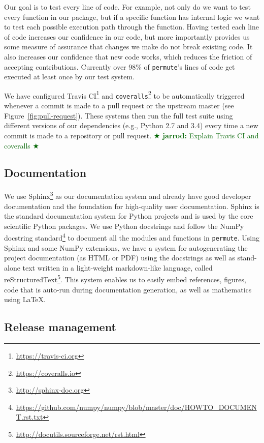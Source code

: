 \documentclass[]{article}
\newcommand{\jarrod}[1] { \textcolor{darkgreen} {
\ensuremath{\bigstar} {\bf jarrod:}  {#1}
\ensuremath{\bigstar} } }
\begin{document}
Our goal is to test every line of code.
For example, not only do we want to test every function in our package, but if
a specific function has internal logic we want to test each possible execution
path through the function.
Having tested each line of code increases our confidence in our code, but
more importantly provides us some measure of assurance that changes we make do
not break existing code.
It also increases our confidence that new code works, which reduces the
friction of accepting contributions.
Currently over 98\% of \texttt{permute}'s lines of code get executed at least
once by our test system.

We have configured Travis CI\footnote{\url{https://travis-ci.org}} and
\texttt{coveralls}\footnote{\url{https://coveralls.io}} to be automatically
triggered whenever a commit is made to a pull request or the upstream master
(see Figure~\ref{fig:pull-request}).
These systems then run the full test suite  using different versions of our
dependencies (e.g., Python 2.7 and 3.4) every time a new commit is made to a
repository or pull request.
\jarrod{Explain Travis CI and coveralls}

\subsection{\label{sec:doc}Documentation}

We use Sphinx\footnote{\url{http://sphinx-doc.org}} as our documentation system
and already have good developer documentation and the foundation for
high-quality user documentation.
Sphinx is the standard documentation system for Python projects and is used by
the core scientific Python packages.
We use Python docstrings and follow the NumPy docstring
standard\footnote{\url{https://github.com/numpy/numpy/blob/master/doc/HOWTO\_DOCUMENT.rst.txt}}
to document all the modules and functions in \texttt{permute}.
Using Sphinx and some NumPy extensions, we have a system for autogenerating the
project documentation (as HTML or PDF) using the docstrings as well as
stand-alone text written in a light-weight markdown-like language, called
reStructuredText\footnote{\url{http://docutils.sourceforge.net/rst.html}}.
This system enables us to easily embed references, figures, code that is
auto-run during documentation generation, as well as mathematics using \LaTeX.

\subsection{\label{sec:release}Release management}
\end{document}
